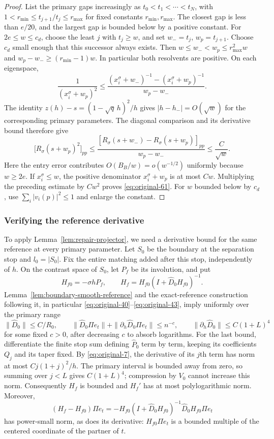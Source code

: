 \begin{proof}
List the primary gaps increasingly as $t_0<t_1<\cdots<t_N$, with
$1<r_{\min}\le t_{j+1}/t_j\le r_{\max}$ for fixed constants
$r_{\min},r_{\max}$.
The closest gap is less than $e/20$, and the largest gap is bounded below by
a positive constant.  For $2e\le w\le c_d$, choose the least $j$ with
$t_j\ge w$, and set $w_-=t_j$, $w_p=t_{j+1}$.
Choose $c_d$ small enough that this successor always exists.  Then
$w\le w_-<w_p\le r_{\max}^2w$ and
$w_p-w_-\ge(r_{\min}-1)w$.
In particular both resolvents are positive.  On each eigenspace,
\[
 \frac{1}{(x_i^\sigma+w_p)^2}
 \le
 \frac{(x_i^\sigma+w_-)^{-1}-(x_i^\sigma+w_p)^{-1}}
 {w_p-w_-}.
\]
The identity $z(h)-s=(1-\sqrt q\,h)^2/h$ gives
$|h-h_-|=O(\sqrt w)$ for the corresponding primary parameters.
The diagonal comparison and its derivative bound therefore give
\begin{equation}
 \bigl[R_\sigma(s+w_p)^2\bigr]_{pp}
 \le
 \frac{[R_\sigma(s+w_-)-R_\sigma(s+w_p)]_{pp}}{w_p-w_-}
 \le \frac{C}{\sqrt w}.
 \label{eq:original-62}
\end{equation}
Here the entry error contributes $O(B_B/w)=o(w^{-1/2})$ uniformly because
$w\ge2e$.  If $x_i^\sigma\le w$, the positive denominator
$x_i^\sigma+w_p$ is at most $Cw$.  Multiplying the preceding estimate by
$Cw^2$ proves \eqref{eq:original-61}.  For $w$ bounded below by $c_d$, use
$\sum_i|v_i(p)|^2\le1$ and enlarge the constant.
\end{proof}

\subsubsection*{Verifying the reference derivative}
To apply Lemma~\ref{lem:repair-projector}, we need a derivative bound for the
same reference at every primary parameter.  Let $S_0$ be the boundary at the
separation stop and $l_0=|S_0|$.
Fix the entire matching added after this stop, independently of $h$.
On the contrast space of $S_0$, let $P_f$ be its involution, and put
\[
 H_{f0}=-\sigma hP_f,\qquad
 H_f=H_{f0}(I+\widehat D_0H_{f0})^{-1}.
\]
Lemma~\ref{lem:boundary-smooth-reference} and the exact-reference construction
following it, in particular \eqref{eq:original-40}--\eqref{eq:original-43},
imply uniformly over the primary range
\[
 \|\widehat D_0\|\le C/R_0,\qquad
 \|\widehat D_0\Pi e_t\|+
 \|\partial_h\widehat D_0\Pi e_t\|\le n^{-c},
 \qquad \|\partial_h\widehat D_0\|\le C(1+L)^4
\]
for some fixed $c>0$, after decreasing $c$ to absorb logarithms.  For the last
bound, differentiate the finite stop sum defining $\widehat P_0$ term by
term, keeping its coefficients $Q_j$ and its taper fixed.  By
\eqref{eq:original-7}, the derivative of its $j$th term has norm at most
$Cj(1+j)^2/h$.  The primary interval is bounded away from zero, so
summing over $j<L$ gives $C(1+L)^4$; compression by $V_0$ cannot
increase this norm.  Consequently $H_f$ is bounded and $H_f'$ has at most
polylogarithmic norm.  Moreover,
\[
 (H_f-H_{f0})\Pi e_t
 =-H_{f0}(I+\widehat D_0H_{f0})^{-1}
       \widehat D_0H_{f0}\Pi e_t
\]
has power-small norm, as does its derivative: $H_{f0}\Pi e_t$ is a bounded
multiple of the centered coordinate of the partner of $t$.

